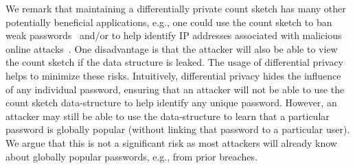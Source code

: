 We remark that maintaining a differentially private count sketch has many other potentially beneficial applications, e.g., one could use the count sketch to ban weak passwords~\cite{HTS:SchHerMit10} and/or to help identify IP addresses associated with malicious online attacks~\cite{EuroSP:THS19}. One disadvantage is that the attacker will also be able to view the count sketch if the data structure is leaked. The usage of differential privacy helps to minimize these risks. Intuitively, differential privacy hides the influence of any individual password, ensuring that an attacker will not be able to use the count sketch data-structure to help identify any unique password. However, an attacker may still be able to use the data-structure to learn that a particular password is globally popular (without linking that password to a particular user). We argue that this is not a significant risk as most attackers will already know about globally popular passwords, e.g., from prior breaches. 
